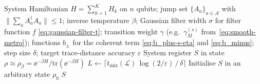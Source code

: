 \begin{algorithm}[H]
\caption{\textsc{CKG-GibbsSampler}}
\label{alg:main}
\begin{algorithmic}[1]
\small
\Require
  System Hamiltonian $H = \sum_{k=1}^{K} H_k$ on $n$ qubits;
  jump set $\{A_a\}_{a\in\mathcal{A}}$ with $\bigl\lVert\sum_a A_a^\dagger A_a\bigr\rVert \le 1$;
  inverse temperature $\beta$;
  Gaussian filter width $\sigma$ for filter function $f$ \eqref{eq:gaussian-filter-t};
  transition weight $\gamma$ (e.g.\ $\gamma_M^{(s)}$ from~\eqref{eq:smooth-metro});
  functions $b_\pm$ for the coherent term \eqref{eq:b_plus-s-eta} and \eqref{eq:b_minus};
  step size $\delta$;
  target trace-distance accuracy $\varepsilon$
\Ensure System register $S$ in state
  $\rho \approx \rho_\beta = \ee^{-\beta H}/\mathrm{tr}(\ee^{-\beta H})$
\Statex
\State $L \gets \bigl\lceil t_{\mathrm{mix}}(\mathcal{L})\,
       \log(2/\varepsilon)\,/\,\delta \bigr\rceil$
\State Initialise $S$ in an arbitrary state $\rho_0$
    \State {}
    \State {}
  \EndFor
\EndFor
\State \Return $S$
\end{algorithmic}
\end{algorithm}

